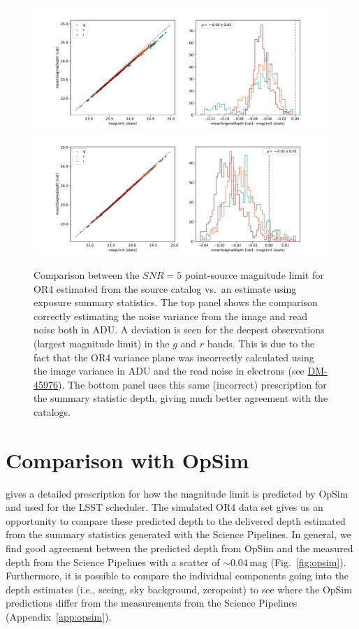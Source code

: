 \documentclass[DM,authoryear,toc]{lsstdoc}
\begin{document}
\begin{figure}[t!]
    \includegraphics[width=\textwidth]{figures/or4_maglim_compare_adu_adu.pdf}
    \includegraphics[width=\textwidth]{figures/or4_maglim_compare_adu_e-.pdf}
    \caption{\label{fig:maglim} Comparison between the $SNR = 5$ point-source magnitude limit for OR4 estimated from the source catalog vs.\ an estimate using exposure summary statistics. The top panel shows the comparison correctly estimating the noise variance from the image and read noise both in ADU. A deviation is seen for the deepest observations (largest magnitude limit) in the $g$ and $r$ bands. This is due to the fact that the OR4 variance plane was incorrectly calculated using the image variance in ADU and the read noise in electrons (see \href{https://rubinobs.atlassian.net/browse/DM-45976}{DM-45976}). The bottom panel uses this same (incorrect) prescription for the summary statistic depth, giving much better agreement with the catalogs.}
\end{figure}

\section{Comparison with OpSim}
\label{sec:opsim}

\citet{SMTN-002} gives a detailed prescription for how the magnitude limit is predicted by OpSim and used for the LSST scheduler. The simulated OR4 data set gives us an opportunity to compare these predicted depth to the delivered depth estimated from the summary statistics generated with the Science Pipelines. In general, we find good agreement between the predicted depth from OpSim and the measured depth from the Science Pipelines with a scatter of $\sim 0.04$\,mag (Fig.~\ref{fig:opsim}). Furthermore, it is possible to compare the individual components going into the depth estimates (i.e., seeing, sky background, zeropoint) to see where the OpSim predictions differ from the measurements from the Science Pipelines (Appendix~\ref{app:opsim}). 
\end{document}
